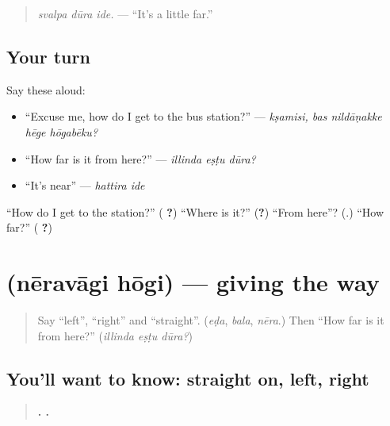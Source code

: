 \begin{quote}
\emph{svalpa dūra ide.} — \textquotedblleft{}It's a little far.\textquotedblright{}
\end{quote}

\subsection*{Your turn}
Say these aloud:

\begin{itemize}
\raggedright
  \item \textquotedblleft{}Excuse me, how do I get to the bus station?\textquotedblright{} — \emph{kṣamisi, bas nildāṇakke hēge hōgabēku?}
  \item \textquotedblleft{}How far is it from here?\textquotedblright{} — \emph{illinda eṣṭu dūra?}
  \item \textquotedblleft{}It's near\textquotedblright{} — \emph{hattira ide}
\end{itemize}

\begin{tcolorbox}[breakable,colback=teal!4,colframe=teal!35!black,title={Before you move on}]
\textquotedblleft{}How do I get to the station?\textquotedblright{} (\textbf{  ?}) \textquotedblleft{}Where is it?\textquotedblright{} (\textbf{?}) \textquotedblleft{}From here\textquotedblright{}? (\textbf{}.) \textquotedblleft{}How far?\textquotedblright{} (\textbf{ ?})
\end{tcolorbox}
\section[\texorpdfstring{\kn{ನೇರವಾಗಿ} \kn{ಹೋಗಿ} (nēravāgi hōgi)}{ನೇರವಾಗಿ ಹೋಗಿ (nēravāgi hōgi)}]{  (nēravāgi hōgi) — giving the way}

\label{lesson:KA-C313-neravagi-hogi}



\begin{quote}
Say \textquotedblleft{}left\textquotedblright{}, \textquotedblleft{}right\textquotedblright{} and \textquotedblleft{}straight\textquotedblright{}. (\emph{eḍa}, \emph{bala}, \emph{nēra}.) Then \textquotedblleft{}How far is it from here?\textquotedblright{} (\emph{illinda eṣṭu dūra?})
\end{quote}

\subsection*{You'll want to know: straight on, left, right}
\begin{quote}
\textbf{ .    .}
\end{quote}

